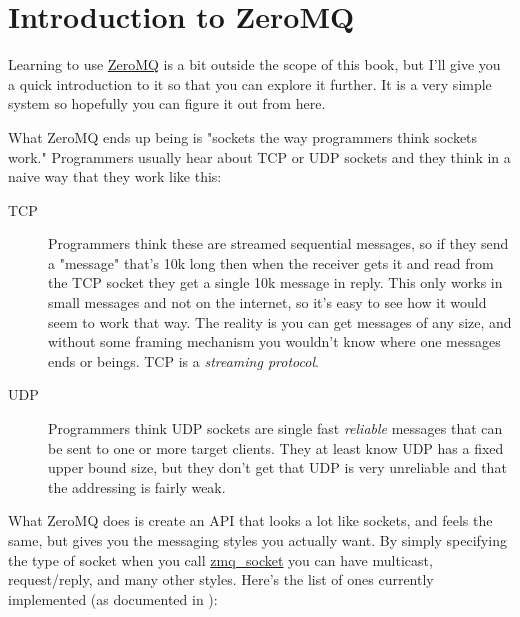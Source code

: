 \section{Introduction to ZeroMQ}


Learning to use \href{http://zeromq.org}{ZeroMQ} is a bit outside the scope of this book, but I'll give you
a quick introduction to it so that you can explore it further.  It is a very simple
system so hopefully you can figure it out from here.

What ZeroMQ ends up being is "sockets the way programmers think sockets work."  Programmers
usually hear about TCP or UDP sockets and they think in a naive way that they work like
this:

\begin{description}
\item [TCP] Programmers think these are streamed sequential messages, so if
   they send a "message" that's 10k long then when the receiver gets it and read
   from the TCP socket they get a single 10k message in reply.  This only works in
   small messages and not on the internet, so it's easy to see how it would seem
   to work that way.  The reality is you can get messages of any size, and without
   some framing mechanism you wouldn't know where one messages ends or beings.
   TCP is a \emph{streaming protocol}.

\item [UDP] Programmers think UDP sockets are single fast \emph{reliable} messages
    that can be sent to one or more target clients.  They at least know UDP has a fixed
    upper bound size, but they don't get that UDP is very unreliable and that the addressing
    is fairly weak.
\end{description}

What ZeroMQ does is create an API that looks a lot like sockets, and feels the
same, but gives you the messaging styles you actually want.  By simply
specifying the type of socket when you call
\href{http://api.zeromq.org/zmq\_socket.html}{zmq\_socket} you can have
multicast, request/reply, and many other styles.  Here's the list of ones
currently implemented (as documented in ):


